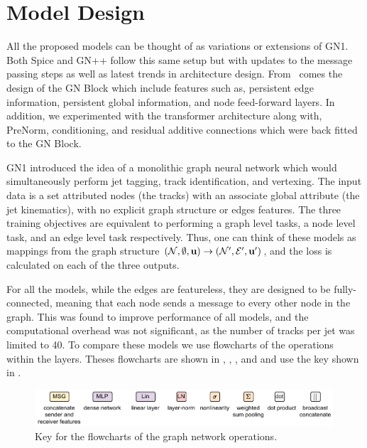 \section{Model Design}

All the proposed models can be thought of as variations or extensions of GN1.
Both Spice and GN++ follow this same setup but with updates to the message passing steps as well as latest trends in architecture design.
From~\textcite{RelationalInductiveBiases} comes the design of the GN Block which include features such as, persistent edge information, persistent global information, and node feed-forward layers.
In addition, we experimented with the transformer architecture along with, PreNorm, conditioning, and residual additive connections which were back fitted to the GN Block.

GN1 introduced the idea of a monolithic graph neural network which would simultaneously perform jet tagging, track identification, and vertexing.
The input data is a set attributed nodes (the tracks) with an associate global attribute (the jet kinematics), with no explicit graph structure or edges features.
The three training objectives are equivalent to performing a graph level tasks, a node level task, and an edge level task respectively.
Thus, one can think of these models as mappings from the graph structure $(\mathcal{N}, \emptyset, \mathbf{u}) \rightarrow (\mathcal{N}', \mathcal{E}', \mathbf{u}')$, and the loss is calculated on each of the three outputs.

For all the models, while the edges are featureless, they are designed to be fully-connected, meaning that each node sends a message to every other node in the graph.
This was found to improve performance of all models, and the computational overhead was not significant, as the number of tracks per jet was limited to 40.
To compare these models we use flowcharts of the operations within the layers.
Theses flowcharts are shown in , , , and  and use the key shown in .

\begin{figure}
    \centering
    \includegraphics[width=0.99\textwidth]{figures/flavour_tagging/key.pdf}
    \caption{Key for the flowcharts of the graph network operations.}
    \label{fig:key}
\end{figure}

